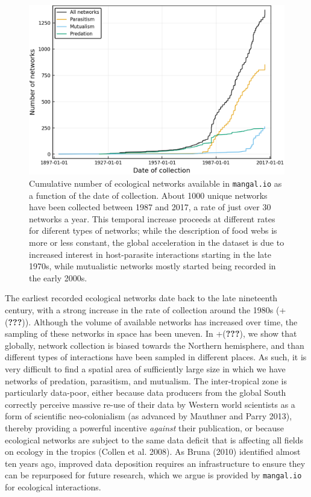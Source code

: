 \documentclass[11pt]{article}
\begin{document}
\begin{figure}
\hypertarget{fig:temporal}{%
\centering
\includegraphics{figures/network_growth_over_time.png}
\caption{Cumulative number of ecological networks available in
\texttt{mangal.io} as a function of the date of collection. About 1000
unique networks have been collected between 1987 and 2017, a rate of
just over 30 networks a year. This temporal increase proceeds at
different rates for diferent types of networks; while the description of
food webs is more or less constant, the global acceleration in the
dataset is due to increased interest in host-parasite interactions
starting in the late 1970s, while mutualistic networks mostly started
being recorded in the early 2000s.}\label{fig:temporal}
}
\end{figure}

The earliest recorded ecological networks date back to the late
nineteenth century, with a strong increase in the rate of collection
around the 1980s (+({\textbf{???}})). Although the volume of available
networks has increased over time, the sampling of these networks in
space has been uneven. In +({\textbf{???}}), we show that globally,
network collection is biased towards the Northern hemisphere, and than
different types of interactions have been sampled in different places.
As such, it is very difficult to find a spatial area of sufficiently
large size in which we have networks of predation, parasitism, and
mutualism. The inter-tropical zone is particularly data-poor, either
because data producers from the global South correctly perceive massive
re-use of their data by Western world scientists as a form of scientific
neo-colonialism (as advanced by Mauthner and Parry 2013), thereby
providing a powerful incentive \emph{against} their publication, or
because ecological networks are subject to the same data deficit that is
affecting all fields on ecology in the tropics (Collen et al. 2008). As
Bruna (2010) identified almost ten years ago, improved data deposition
requires an infrastructure to ensure they can be repurposed for future
research, which we argue is provided by \texttt{mangal.io} for
ecological interactions.
\end{document}
